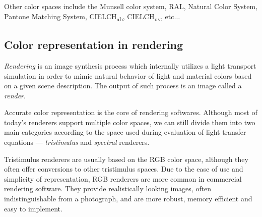 Other color spaces include the Munsell color system, RAL, Natural Color System, Pantone Matching System, CIELCH\textsubscript{ab}, CIELCH\textsubscript{uv}, etc$\ldots$

\subsection{Color representation in rendering}

\emph{Rendering} is an image synthesis process which internally utilizes a light transport simulation in order to mimic natural behavior of light and material colors based on a given scene description. The output of such process is an image called a \emph{render}.

Accurate color representation is the core of rendering softwares. Although most of today's renderers support multiple color spaces, we can still divide them into two main categories according to the space used during evaluation of light transfer equations --- \emph{tristimulus} and \emph{spectral} renderers.

Tristimulus renderers are usually based on the RGB color space, although they often offer conversions to other tristimulus spaces. Due to the ease of use and simplicity of representation, RGB renderers are more common in commercial rendering software. They provide realistically looking images, often indistinguishable from a photograph, and are more robust, memory efficient and easy to implement.

